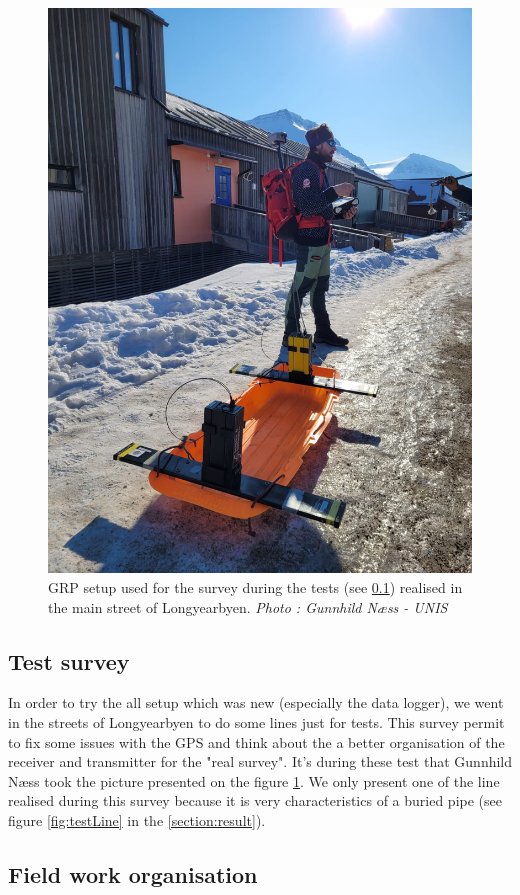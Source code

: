 \begin{figure} [H]
    \centering
    \includegraphics[width=0.7\linewidth]{Images/00_Methodology/PictureGunnhild.jpg}
    \caption{GRP setup used for the survey during the tests (see \ref{Subsection:TestSurvey}) realised in the main street of Longyearbyen. \emph{Photo : Gunnhild Næss - UNIS}}
    \label{fig:PictureGunnhild}
\end{figure}

\subsection{Test survey} \label{Subsection:TestSurvey}

In order to try the all setup which was new (especially the data logger), we went in the streets of Longyearbyen to do some lines just for tests. This survey permit to fix some issues with the GPS and think about the a better organisation of the receiver and transmitter for the "real survey". It's during these test that Gunnhild Næss took the picture presented on the figure \ref{fig:PictureGunnhild}. We only present one of the line realised during this survey because it is very characteristics of a buried pipe (see figure \ref{fig:testLine} in the \ref{section:result}).

\subsection{Field work organisation}


